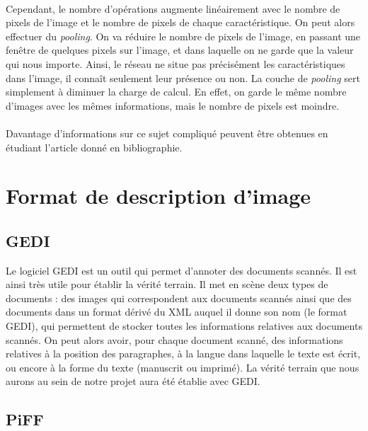 \paragraph{}
Cependant, le nombre d'opérations augmente linéairement avec le nombre de pixels de l'image et le
nombre de pixels de chaque caractéristique. On peut alors effectuer du \textit{pooling}. On va
réduire le nombre de pixels de l'image, en passant une fenêtre de quelques pixels sur l'image,
et dans laquelle on ne garde que la valeur qui nous importe. Ainsi, le réseau ne situe pas précisément
les caractéristiques dans l'image, il connaît seulement leur présence ou non. La couche de
\textit{pooling} sert simplement à diminuer la charge de calcul. En effet, on garde le même nombre
d'images avec les mêmes informations, mais le nombre de pixels est moindre.

\paragraph{}
Davantage d'informations sur ce sujet compliqué peuvent être obtenues en étudiant l'article\cite{cdbn:2009} donné en bibliographie.

\section{Format de description d'image}

\subsection{GEDI}

Le logiciel GEDI est un outil qui permet d'annoter des documents scannés. Il est ainsi très utile pour établir
la vérité terrain. Il met en scène deux types de documents : des images qui correspondent aux documents
scannés ainsi que des documents dans un format dérivé du XML auquel il donne son nom (le format GEDI), qui
permettent de stocker toutes les informations relatives aux documents scannés. On peut alors avoir, pour
chaque document scanné, des informations relatives à la position des paragraphes, à la langue dans laquelle
le texte est écrit, ou encore à la forme du texte (manuscrit ou imprimé). La vérité terrain que nous aurons
au sein de notre projet aura été établie avec GEDI.

\subsection{PiFF}

